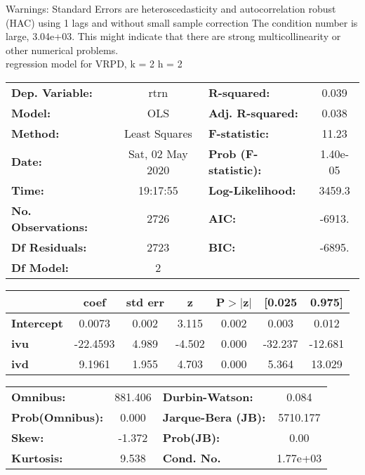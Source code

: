 Warnings: \newline
 [1] Standard Errors are heteroscedasticity and autocorrelation robust (HAC) using 1 lags and without small sample correction \newline
 [2] The condition number is large, 3.04e+03. This might indicate that there are \newline
 strong multicollinearity or other numerical problems.\\ 

regression model for VRPD, k = 2 h = 2\begin{center}
\begin{tabular}{lclc}
\toprule
\textbf{Dep. Variable:}    &       rtrn       & \textbf{  R-squared:         } &     0.039   \\
\textbf{Model:}            &       OLS        & \textbf{  Adj. R-squared:    } &     0.038   \\
\textbf{Method:}           &  Least Squares   & \textbf{  F-statistic:       } &     11.23   \\
\textbf{Date:}             & Sat, 02 May 2020 & \textbf{  Prob (F-statistic):} &  1.40e-05   \\
\textbf{Time:}             &     19:17:55     & \textbf{  Log-Likelihood:    } &    3459.3   \\
\textbf{No. Observations:} &        2726      & \textbf{  AIC:               } &    -6913.   \\
\textbf{Df Residuals:}     &        2723      & \textbf{  BIC:               } &    -6895.   \\
\textbf{Df Model:}         &           2      & \textbf{                     } &             \\
\bottomrule
\end{tabular}
\begin{tabular}{lcccccc}
                   & \textbf{coef} & \textbf{std err} & \textbf{z} & \textbf{P$> |$z$|$} & \textbf{[0.025} & \textbf{0.975]}  \\
\midrule
\textbf{Intercept} &       0.0073  &        0.002     &     3.115  &         0.002        &        0.003    &        0.012     \\
\textbf{ivu}       &     -22.4593  &        4.989     &    -4.502  &         0.000        &      -32.237    &      -12.681     \\
\textbf{ivd}       &       9.1961  &        1.955     &     4.703  &         0.000        &        5.364    &       13.029     \\
\bottomrule
\end{tabular}
\begin{tabular}{lclc}
\textbf{Omnibus:}       & 881.406 & \textbf{  Durbin-Watson:     } &    0.084  \\
\textbf{Prob(Omnibus):} &   0.000 & \textbf{  Jarque-Bera (JB):  } & 5710.177  \\
\textbf{Skew:}          &  -1.372 & \textbf{  Prob(JB):          } &     0.00  \\
\textbf{Kurtosis:}      &   9.538 & \textbf{  Cond. No.          } & 1.77e+03  \\
\bottomrule
\end{tabular}
\end{center}

